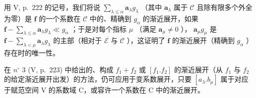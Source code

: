 用 V, p.~222 的记号，我们将说 \(\sum_{\lambda \leqslant \alpha} \mathbf{a}_{\lambda} g_{\lambda}\) （其中 \(\mathbf{a}_{\lambda}\) 属于 \(\mathcal{C}\) 且除有限多个外全为零）是 \(\mathbf{f}\) 的一个系数在 \(\mathcal{C}\) 中的、精确到 \(g_{\alpha}\) 的渐近展开，如果 \(\mathbf{f} - \sum_{\lambda \leqslant \alpha} \mathbf{a}_{\lambda} g_{\lambda} \ll g_{\alpha}\) ；于是对每个指标 \(\mu\) （满足 \(\mathbf{a}_{\mu} \neq 0\) ）， \(\mathbf{a}_{\mu} g_{\mu}\) 是 \(\mathbf{f} - \sum_{\lambda < \mu} \mathbf{a}_{\lambda} g_{\lambda}\) 的主部（相对于 \(\mathcal{E}\) 与 \(\mathcal{C}\) ），这证明了 \(\mathbf{f}\) 的渐近展开（精确到 \(g_{\alpha}\) ）存在时的唯一性。

在 \(n^{\circ}\) 3 (V, p.~223) 中给出的、构成 \(f_{1} + f_{2}\) 或 \([f_{1}.f_{2}]\) 的渐近展开（从 \(f_{1}\) 与 \(f_{2}\) 的给定渐近展开出发）的方法，仍可应用于变系数展开，只要 \([a_{\lambda}.b_{\mu}]\) 属于对应于赋范空间 V 的系数域 C，或容许一个系数在 C 中的渐近展开。

